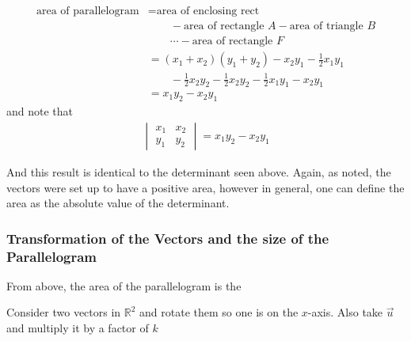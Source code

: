 \begin{align*}
\text{area of parallelogram} & = \text{area of enclosing rect} \\
& \qquad - \text{area of rectangle $A$} - \text{area of triangle $B$} \\
& \qquad \cdots - \text{area of rectangle $F$} \\
& = 
(x_1+x_2)(y_1+y_2) - x_2 y_1 - \frac{1}{2} x_1 y_1 \\
& \qquad - \frac{1}{2} x_2 y_2 - \frac{1}{2} x_2 y_2 - \frac{1}{2} x_1 y_1 - x_2 y_1 \\
& = x_1 y_2 - x_2 y_1 
\end{align*}
and note that 
%
\begin{align*}
\begin{vmatrix}
x_1 & x_2 \\
y_1 & y_2 
\end{vmatrix} = x_1 y_2 - x_2 y_1 
\end{align*}

And this result is identical to the determinant seen above.  Again, as noted, the vectors were set up to have a positive area, however in general, one can define the area as the absolute value of the determinant. 


\subsubsection{Transformation of the Vectors and the size of the Parallelogram}

From above, the area of the parallelogram is the 

Consider two vectors in $\mathbb{R}^2$ and rotate them so one is on the $x$-axis.   Also take $\vec{u}$ and multiply it by a factor of $k$ 


\begin{center}

\end{center}

